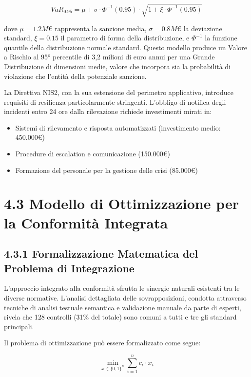 \begin{equation}
VaR_{0.95} = \mu + \sigma \cdot \Phi^{-1}(0.95) \cdot \sqrt{1 + \xi \cdot \Phi^{-1}(0.95)}
\end{equation}

dove $\mu = 1.2M€$ rappresenta la sanzione media, $\sigma = 0.8M€$ la deviazione standard, $\xi = 0.15$ il parametro di forma della distribuzione, e $\Phi^{-1}$ la funzione quantile della distribuzione normale standard. Questo modello produce un Valore a Rischio al 95° percentile di 3,2 milioni di euro annui per una Grande Distribuzione di dimensioni medie, valore che incorpora sia la probabilità di violazione che l'entità della potenziale sanzione.

La Direttiva NIS2, con la sua estensione del perimetro applicativo, introduce requisiti di resilienza particolarmente stringenti. L'obbligo di notifica degli incidenti entro 24 ore dalla rilevazione \autocite{ENISA2024nis2} richiede investimenti mirati in:
\begin{itemize}
\item Sistemi di rilevamento e risposta automatizzati (investimento medio: 450.000€)
\item Procedure di escalation e comunicazione (150.000€)
\item Formazione del personale per la gestione delle crisi (85.000€)
\end{itemize}

\section{4.3 Modello di Ottimizzazione per la Conformità Integrata}

\subsection{4.3.1 Formalizzazione Matematica del Problema di Integrazione}

L'approccio integrato alla conformità sfrutta le sinergie naturali esistenti tra le diverse normative. L'analisi dettagliata delle sovrapposizioni, condotta attraverso tecniche di analisi testuale semantica e validazione manuale da parte di esperti, rivela che 128 controlli (31\% del totale) sono comuni a tutti e tre gli standard principali.

Il problema di ottimizzazione può essere formalizzato come segue:

\begin{equation}
\min_{x \in \{0,1\}^n} \sum_{i=1}^{n} c_i \cdot x_i
\end{equation}

